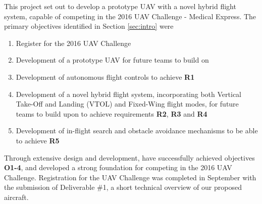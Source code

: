 
This project set out to develop a prototype UAV with a novel hybrid flight system, capable of competing in the 2016 UAV Challenge - Medical Express. The primary objectives identified in Section \ref{sec:intro} were
\begin{enumerate}[label=\bfseries O\arabic*:] \itemsep-2pt
	\item Register for the 2016 UAV Challenge
	\item Development of a prototype UAV for future teams to build on
	\item Development of autonomous flight controls to achieve \textbf{R1}
	\item Development of a novel hybrid flight system, incorporating both Vertical Take-Off and Landing (VTOL) and Fixed-Wing flight modes, for future teams to build upon to achieve requirements \textbf{R2}, \textbf{R3} and \textbf{R4}
	\item Development of in-flight search and obstacle avoidance mechanisms to be able to achieve \textbf{R5}
\end{enumerate}

Through extensive design and development, \ID have successfully achieved objectives \textbf{O1-4}, and developed a strong foundation for competing in the 2016 UAV Challenge. Registration for the UAV Challenge was completed in September with the submission of Deliverable \#1, a short technical overview of our proposed aircraft. 